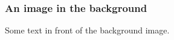 %
\begin{frame}
    \frametitle{An image in the background}
    \centering
    Some text in front of the background image.
\end{frame}
